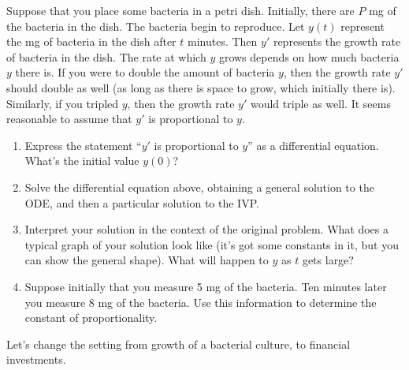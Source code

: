 \begin{problem}\label{exponential growth application}
Suppose that you place some bacteria in a petri dish. Initially, there are $P$ mg of the bacteria in the dish. The bacteria begin to reproduce. Let $y(t)$ represent the mg of bacteria in the dish after $t$ minutes. Then $y'$ represents the growth rate of bacteria in the dish. The rate at which $y$ grows depends on how much bacteria $y$ there is. If you were to double the amount of bacteria $y$, then the growth rate $y'$ should double as well (as long as there is space to grow, which initially there is). Similarly, if you tripled $y$, then the growth rate $y'$ would triple as well. It seems reasonable to assume that $y'$ is proportional to $y$.
\begin{enumerate}
 \item Express the statement ``$y'$ is proportional to $y$'' as a differential equation. What's the initial value $y(0)$? 
 \item 
{}%
Solve the differential equation above, obtaining a general solution to the ODE, and then a particular solution to the IVP.
 \item Interpret your solution in the context of the original problem. What does a typical graph of your solution look like (it's got some constants in it, but you can show the general shape). What will happen to $y$ as $t$ gets large?
 \item Suppose initially that you measure 5 mg of the bacteria. Ten minutes later you measure 8 mg of the bacteria. Use this information to determine the constant of proportionality.
\end{enumerate}
\end{problem}

Let's change the setting from growth of a bacterial culture, to financial investments. 



